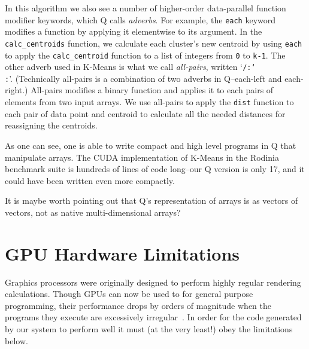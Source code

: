 \documentclass[preprint]{sigplanconf}
\begin{document}
In this algorithm we also see a number of higher-order data-parallel function
modifier keywords, which Q calls \emph{adverbs}.  For example, the \texttt{each}
keyword modifies a function by applying it elementwise to its argument.  In the
\texttt{calc\_centroids} function, we calculate each cluster's new centroid
by using \texttt{each} to apply the \texttt{calc\_centroid} function to a
list of integers from \texttt{0} to \texttt{k-1}.  The other adverb used in
K-Means is what we call \emph{all-pairs}, written `\texttt{/:\char`\\:}'.
(Technically all-pairs is a combination of two adverbs in Q--each-left and
each-right.) All-pairs modifies a binary function and applies it to each
pairs of elements from two input arrays.  We use all-pairs to apply the
\texttt{dist} function to each pair of data point and centroid to calculate all
the needed distances for reassigning the centroids.

As one can see, one is able to write compact and high level programs in Q
that manipulate arrays.  The CUDA implementation of K-Means in the Rodinia
benchmark suite is hundreds of lines of code long--our Q version is only 17,
and it could have been written even more compactly.

It is maybe worth pointing out that Q's representation of arrays is as vectors
of vectors, not as native multi-dimensional arrays?

\section{GPU Hardware Limitations}
Graphics processors were originally designed to perform highly regular rendering calculations. 
Though GPUs can now be used to for general purpose programming, their performance drops
by orders of magnitude when the programs they execute are excessively irregular~\cite{NvidCU}. 
In order for the code generated by our system to perform well it must (at the very least!) obey the limitations below. 
\end{document}
